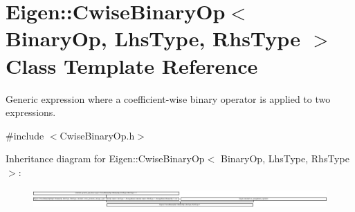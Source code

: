 \hypertarget{class_eigen_1_1_cwise_binary_op}{}\section{Eigen\+::Cwise\+Binary\+Op$<$ Binary\+Op, Lhs\+Type, Rhs\+Type $>$ Class Template Reference}
\label{class_eigen_1_1_cwise_binary_op}


Generic expression where a coefficient-\/wise binary operator is applied to two expressions.  




{\ttfamily \#include $<$Cwise\+Binary\+Op.\+h$>$}

Inheritance diagram for Eigen\+::Cwise\+Binary\+Op$<$ Binary\+Op, Lhs\+Type, Rhs\+Type $>$\+:\begin{figure}[H]
\begin{center}
\leavevmode
\includegraphics[height=0.734266cm]{class_eigen_1_1_cwise_binary_op}
\end{center}
\end{figure}
